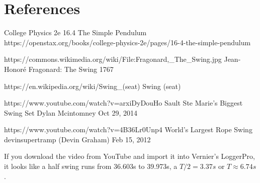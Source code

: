 \documentclass[12pt]{iopart}
\begin{document}
\section*{References}
\begin{thebibliography}{99}

College Physics 2e
16.4 The Simple Pendulum
https://openstax.org/books/college-physics-2e/pages/16-4-the-simple-pendulum

	https://commons.wikimedia.org/wiki/File:Fragonard,\_The\_Swing.jpg
	Jean-Honoré Fragonard: The Swing 
	1767

	https://en.wikipedia.org/wiki/Swing\_(seat)
		Swing (seat)

https://www.youtube.com/watch?v=arxiDyDouHo
Sault Ste Marie's Biggest Swing Set
Dylan Mcintomney
Oct 29, 2014

https://www.youtube.com/watch?v=4B36Lr0Unp4
World's Largest Rope Swing
devinsupertramp (Devin Graham)
Feb 15, 2012

\cite{details} If you download the video from YouTube and import it into Vernier's LoggerPro, it looks like a half swing runs from 36.603s to 39.973s, a $T/2=3.37s$ or $T\approx6.74s$.  
\end{thebibliography}
\end{document}
